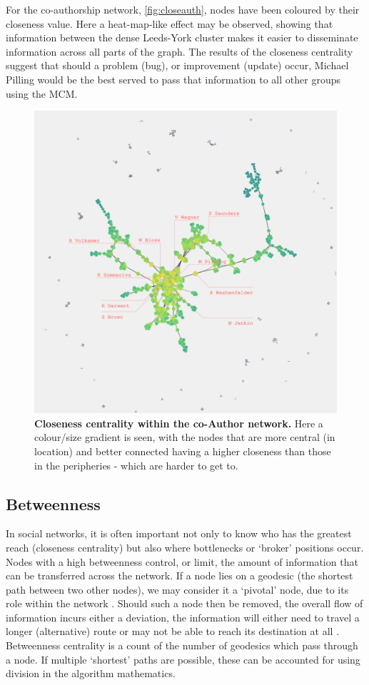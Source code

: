 For the co-authorship network, \autoref{fig:closeauth}, nodes have been coloured by their closeness value. Here a heat-map-like effect may be observed, showing that information between the dense Leeds-York cluster makes it easier to disseminate information across all parts of the graph. The results of the closeness centrality suggest that should a problem (bug), or improvement (update) occur, Michael Pilling would be the best served to pass that information to all other groups using the MCM. 

\begin{figure}[H]
     \centering
         \includegraphics[width=.8\textwidth]{figures_c3/closenessauthor.png}
         
         
        \caption{ \textbf{Closeness centrality within the co-Author network.} Here a colour/size gradient is seen, with the nodes that are more central (in location) and better connected having a higher closeness than those in the peripheries - which are harder to get to.}
        \label{fig:closeauth}
\end{figure}
% 
% 
% 
\subsection{Betweenness}\label{sec:betweenness}
In social networks, it is often important not only to know who has the greatest reach (closeness centrality) but also where bottlenecks or `broker' positions occur. Nodes with a high betweenness control, or limit, the amount of information that can be transferred across the network. If a node lies on a geodesic (the shortest path between two other nodes), we may consider it a `pivotal' node, due to its role within the network \citep{neoj4}. Should such a node then be removed, the overall flow of information incurs either a deviation, the information will either need to travel a longer (alternative) route or may not be able to reach its destination at all \citep{betweenness, between, betweenfast,examples_centrality}.
Betweenness centrality is a count of the number of geodesics which pass through a node. If multiple `shortest' paths are possible, these can be accounted for using division in the algorithm mathematics. 


